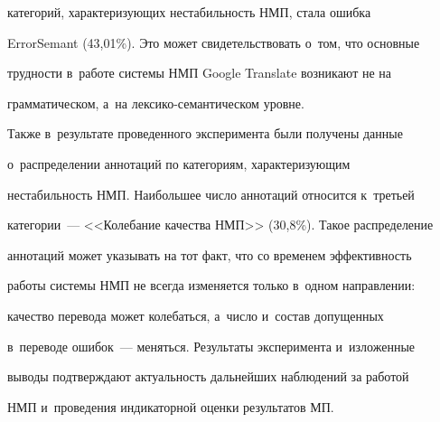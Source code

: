 категорий, ха\-рак\-те\-ри\-зу\-ющих не\-ста\-биль\-ность НМП, стала ошибка 


ErrorSemant (43,01\%). Это может свидетельствовать о~том, что основные 


трудности в~работе сис\-те\-мы НМП Google Translate возникают не на 


грамматическом, а~на лек\-си\-ко-се\-ман\-ти\-че\-ском уровне.


   


   Также в~результате проведенного эксперимента были получены данные 


о~распределении аннотаций по категориям, ха\-рак\-те\-ри\-зу\-ющим 


не\-ста\-биль\-ность НМП. Наибольшее число аннотаций относится к~третьей 


категории~---  <<Колебание качества НМП>> (30,8\%). Такое распределение 


аннотаций может указывать на тот факт, что со временем эф\-фек\-тив\-ность 


работы системы НМП не всегда изменяется только в~одном на\-прав\-ле\-нии: 


качество перевода может колебаться, а~чис\-ло и~со\-став допущенных 


в~переводе ошибок~--- меняться. Результаты эксперимента и~изложенные 


выводы под\-тверж\-да\-ют актуальность дальнейших наблюдений за работой 


НМП и~проведения индикаторной оценки результатов МП.





